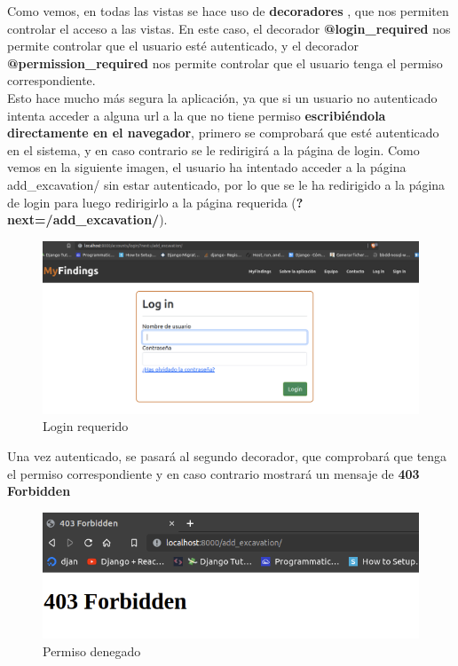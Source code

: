 Como vemos, en todas las vistas se hace uso de \textbf{decoradores} \cite{decorators},
que nos permiten controlar el acceso a las vistas. En este caso, el decorador
\textbf{@login\_required} nos permite controlar que el usuario esté autenticado,
y el decorador \textbf{@permission\_required} nos permite controlar que el usuario
tenga el permiso correspondiente.\\

Esto hace mucho más segura la aplicación, ya que si un usuario no autenticado intenta
acceder a alguna url a la que no tiene permiso \textbf{escribiéndola directamente en
el navegador}, primero se comprobará que esté autenticado en el sistema, y en caso
contrario se le redirigirá a la página de login. Como vemos en la siguiente imagen,
el usuario ha intentado acceder a la página add\_excavation/ sin estar autenticado,
por lo que se le ha redirigido a la página de login para luego redirigirlo a la página
requerida (\textbf{?next=/add\_excavation/}).

    \begin{figure}[H]
        \centering
        \includegraphics[scale=0.26]{imagenes/login-required.png}
        \caption{Login requerido}
        \label{fig:login-required}
    \end{figure}


\newpage Una vez autenticado, se pasará al segundo decorador, que comprobará que tenga el permiso
correspondiente y en caso contrario mostrará un mensaje de \textbf{403 Forbidden}

    \begin{figure}[H]
        \centering
        \includegraphics[scale=0.50]{imagenes/403-forbidden.png}
        \caption{Permiso denegado}
        \label{fig:403-forbidden}
    \end{figure}


